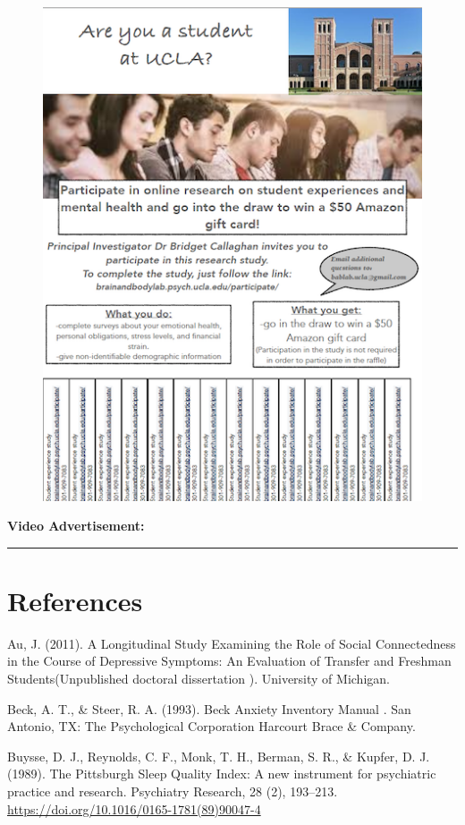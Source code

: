 \documentclass[]{book}
\begin{document}
\begin{figure}
\centering
\includegraphics{images/tmh_flyer.png}
\caption{}
\end{figure}

\textbf{Video Advertisement:}

\begin{center}\rule{0.5\linewidth}{0.5pt}\end{center}

\hypertarget{references}{%
\chapter{References}\label{references}}

Au, J. (2011). A Longitudinal Study Examining the Role of Social Connectedness in the Course
of Depressive Symptoms: An Evaluation of Transfer and Freshman
Students(Unpublished doctoral dissertation ). University of Michigan.

Beck, A. T., \& Steer, R. A. (1993). Beck Anxiety Inventory Manual . San Antonio, TX: The
Psychological Corporation Harcourt Brace \& Company.

Buysse, D. J., Reynolds, C. F., Monk, T. H., Berman, S. R., \& Kupfer, D. J. (1989). The
Pittsburgh Sleep Quality Index: A new instrument for psychiatric practice and research.
Psychiatry Research, 28 (2), 193--213. \url{https://doi.org/10.1016/0165-1781(89)90047-4}
\end{document}
